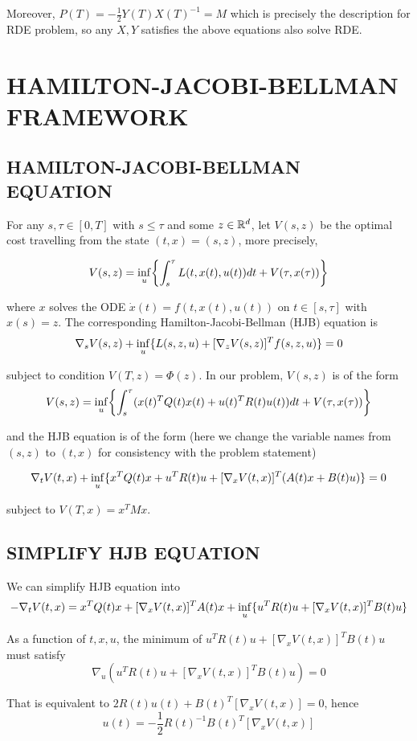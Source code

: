 Moreover, $P(T) = - \frac{1}{2} Y(T) X(T)^{-1} = M$ which is precisely the description for RDE problem, so any $X, Y$ satisfies the above equations also solve RDE.

\section{HAMILTON-JACOBI-BELLMAN FRAMEWORK}

\subsection{HAMILTON-JACOBI-BELLMAN EQUATION}

For any $s, \tau \in [0, T]$ with $s \leq \tau$ and some $z \in \mathbb{R}^d$, let $V(s, z)$ be the optimal cost travelling from the state $(t, x) = (s, z)$, more precisely,

$$
	V(s, z) = \inf_u \set*{\int_s^\tau L(t, x(t), u(t)) dt + V(\tau, x(\tau))}
$$

where $x$ solves the ODE $\dot{x}(t) = f(t, x(t), u(t))$ on $t \in [s, \tau]$ with $x(s) = z$. The corresponding Hamilton-Jacobi-Bellman (HJB) equation is 
$$
\nabla_s V(s, z) + \inf_u \{L(s, z, u) + [\nabla_z V(s, z)]^T f(s, z, u)\} = 0
$$

subject to condition $V(T, z) = \Phi(z)$. In our problem, $V(s, z)$ is of the form
$$
	V(s, z) = \inf_u \set*{\int_s^\tau (x(t)^T Q(t) x(t) + u(t)^T R(t) u(t)) dt + V(\tau, x(\tau))}
$$

and the HJB equation is of the form (here we change the variable names from $(s, z)$ to $(t, x)$ for consistency with the problem statement)

$$
	\nabla_t V(t, x) + \inf_u \{x^T Q(t) x + u^T R(t) u + [\nabla_x V(t, x)]^T (A(t) x + B(t) u)\} = 0
$$

subject to $V(T, x) = x^T M x$.

\subsection{SIMPLIFY HJB EQUATION}

We can simplify HJB equation into
$$
	- \nabla_t V(t, x) = x^T Q(t)x + [\nabla_x V(t, x)]^T A(t) x  + \inf_u \{ u^T R(t) u + [\nabla_x V(t, x)]^T B(t) u\}
$$

As a function of $t, x, u$, the minimum of $u^T R(t) u + [\nabla_x V(t, x)]^T B(t) u$ must satisfy
$$
	\nabla_u (u^T R(t) u + [\nabla_x V(t, x)]^T B(t) u) = 0
$$

That is equivalent to $2R(t) u(t) + B(t)^T [\nabla_x V(t, x)] = 0$, hence
$$
	u(t) = - \frac{1}{2} R(t)^{-1} B(t)^T [\nabla_x V(t, x)]
$$

